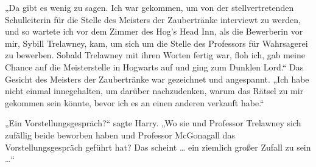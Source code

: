 „Da gibt es wenig zu sagen. Ich war gekommen, um von der stellvertretenden Schulleiterin für die Stelle des Meisters der Zaubertränke interviewt zu werden, und so wartete ich vor dem Zimmer des Hog’s Head Inn, als die Bewerberin vor mir, Sybill Trelawney, kam, um sich um die Stelle des Professors für Wahrsagerei zu bewerben. Sobald Trelawney mit ihren Worten fertig war, floh ich, gab meine Chance auf die Meisterstelle in Hogwarts auf und ging zum Dunklen Lord.“
Das Gesicht des Meisters der Zaubertränke war gezeichnet und angespannt.
„Ich habe nicht einmal innegehalten, um darüber nachzudenken, warum das Rätsel zu mir gekommen sein könnte, bevor ich es an einen anderen verkauft habe.“

„Ein Vorstellungsgespräch?“ sagte Harry.
„Wo sie und Professor Trelawney sich zufällig beide beworben haben und Professor McGonagall das Vorstellungsgespräch geführt hat? Das scheint … ein ziemlich großer Zufall zu sein …“

